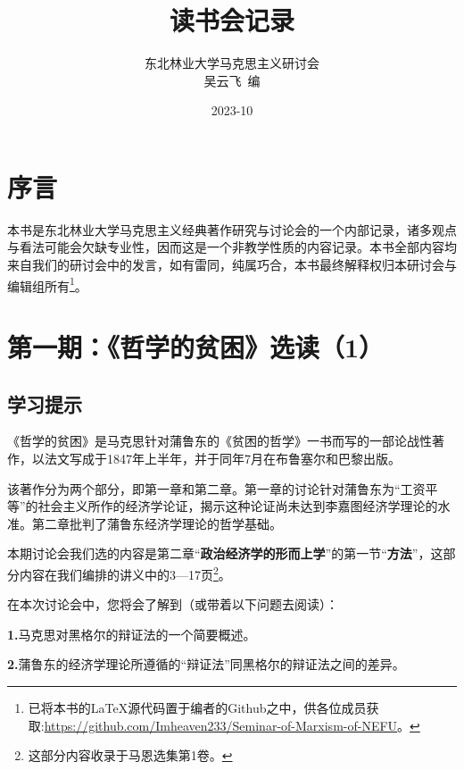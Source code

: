 \documentclass[a4paper,twoside,12pt,AutoFakeBold]{ctexart}
\title{读书会记录}
\author{东北林业大学马克思主义研讨会\\
 吴云飞~编}
\date{2023-10}
\begin{document}
\maketitle
\newpage



\tableofcontents%

\newpage

\section{序言}

\begin{adjustwidth}{2em}{2em}
\qquad\fangsong 
本书是东北林业大学马克思主义经典著作研究与讨论会的一个内部记录，诸多观点与看法可能会欠缺专业性，因而这是一个非教学性质的内容记录。本书全部内容均来自我们的研讨会中的发言，如有雷同，纯属巧合，本书最终解释权归本研讨会与编辑组所有\footnote{已将本书的\LaTeX{}源代码置于编者的Github之中，供各位成员获取:\url{https://github.com/Imheaven233/Seminar-of-Marxism-of-NEFU}。}。

\end{adjustwidth}




\newpage

\section{第一期：《哲学的贫困》选读（1）}

\subsection{学习提示}\label{sec:1}

《哲学的贫困》是马克思针对蒲鲁东的《贫困的哲学》一书而写的一部论战性著作，以法文写成于1847年上半年，并于同年7月在布鲁塞尔和巴黎出版。

该著作分为两个部分，即第一章和第二章。第一章的讨论针对蒲鲁东为“工资平等”的社会主义所作的经济学论证，揭示这种论证尚未达到李嘉图经济学理论的水准。第二章批判了蒲鲁东经济学理论的哲学基础。

本期讨论会我们选的内容是第二章“\textbf{政治经济学的形而上学}”的第一节“\textbf{方法}”，这部分内容在我们编排的讲义中的3—17页\footnote{这部分内容收录于马恩选集第1卷。}。

在本次讨论会中，您将会了解到（或带着以下问题去阅读）：

\textbf{1.}马克思对黑格尔的辩证法的一个简要概述。

\textbf{2.}蒲鲁东的经济学理论所遵循的“辩证法”同黑格尔的辩证法之间的差异。
\end{document}
